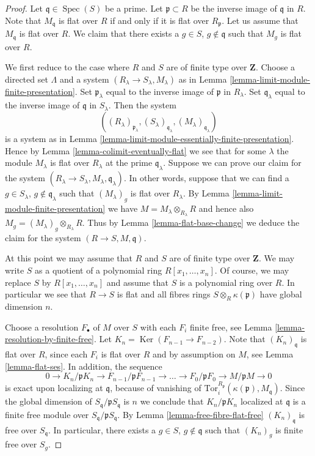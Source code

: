 \documentclass[10pt,a4paper]{amsart}
\theoremstyle{plain}
\theoremstyle{definition}
\theoremstyle{remark}
\numberwithin{equation}{subsection}
\def\Spec{\mathop{\mathrm{Spec}}}
\def\Ker{\mathop{\mathrm{Ker}}}
\begin{document}
\begin{proof}
Let $\mathfrak q \in \Spec(S)$ be a prime.
Let $\mathfrak p \subset R$ be the inverse image of $\mathfrak q$ in $R$.
Note that $M_{\mathfrak q}$ is flat over $R$ if and only if
it is flat over $R_{\mathfrak p}$.
Let us assume that $M_{\mathfrak q}$ is flat over $R$.
We claim that there exists a $g \in S$, $g \not \in \mathfrak q$
such that $M_g$ is flat over $R$.

\medskip\noindent
We first reduce to the case where $R$ and $S$ are
of finite type over $\mathbf{Z}$.
Choose a directed set $\Lambda$ and
a system $(R_\lambda \to S_\lambda, M_\lambda)$
as in Lemma \ref{lemma-limit-module-finite-presentation}.
Set $\mathfrak p_\lambda$ equal to the inverse image of
$\mathfrak p$ in $R_\lambda$.
Set $\mathfrak q_\lambda$ equal to the inverse image of
$\mathfrak q$ in $S_\lambda$.
Then the system
$$
((R_\lambda)_{\mathfrak p_\lambda},
(S_\lambda)_{\mathfrak q_\lambda},
(M_\lambda)_{\mathfrak q_{\lambda}})
$$
is a system as in
Lemma \ref{lemma-limit-module-essentially-finite-presentation}.
Hence by Lemma \ref{lemma-colimit-eventually-flat}
we see that for some $\lambda$ the module
$M_\lambda$ is flat over $R_\lambda$ at the prime
$\mathfrak q_{\lambda}$. Suppose we
can prove our claim for the system
$(R_\lambda \to S_\lambda, M_\lambda, \mathfrak q_{\lambda})$.
In other words, suppose that we can find a $g \in S_\lambda$,
$g \not\in \mathfrak q_\lambda$ such that $(M_\lambda)_g$
is flat over $R_\lambda$. By Lemma \ref{lemma-limit-module-finite-presentation}
we have $M = M_\lambda \otimes_{R_\lambda} R$ and hence
also $M_g = (M_\lambda)_g \otimes_{R_\lambda} R$. Thus by
Lemma \ref{lemma-flat-base-change} we deduce the claim
for the system $(R \to S, M, \mathfrak q)$.

\medskip\noindent
At this point we may assume that $R$ and $S$ are of finite type
over $\mathbf{Z}$. We may write $S$ as a quotient of a
polynomial ring $R[x_1, \ldots, x_n]$. Of course, we may replace
$S$ by $R[x_1, \ldots, x_n]$ and assume that $S$ is a polynomial
ring over $R$. In particular we see that $R \to S$ is flat
and all fibres rings $S \otimes_R \kappa(\mathfrak p)$
have global dimension $n$.

\medskip\noindent
Choose a resolution $F_\bullet$ of $M$ over $S$ with each
$F_i$ finite free, see Lemma \ref{lemma-resolution-by-finite-free}.
Let $K_n = \Ker(F_{n-1} \to F_{n-2})$. Note that
$(K_n)_{\mathfrak q}$ is flat over $R$, since each $F_i$
is flat over $R$ and by assumption on $M$, see Lemma
\ref{lemma-flat-ses}. In addition, the sequence
$$
0 \to
K_n/\mathfrak p K_n \to
F_{n-1}/ \mathfrak p F_{n-1} \to
\ldots \to
F_0 / \mathfrak p F_0 \to
M/\mathfrak p M \to
0
$$
is exact upon localizing at $\mathfrak q$, because of vanishing
of $\text{Tor}_i^{R_\mathfrak p}(\kappa(\mathfrak p), M_{\mathfrak q})$.
Since the global dimension of $S_\mathfrak q/\mathfrak p S_{\mathfrak q}$
is $n$ we conclude that $K_n / \mathfrak p K_n$ localized
at $\mathfrak q$ is a finite free module over
$S_\mathfrak q/\mathfrak p S_{\mathfrak q}$. By
Lemma \ref{lemma-free-fibre-flat-free} $(K_n)_{\mathfrak q}$
is free over $S_{\mathfrak q}$. In particular, there exists a
$g \in S$, $g \not \in \mathfrak q$ such that $(K_n)_g$
is finite free over $S_g$.


\end{proof}
\end{document}
